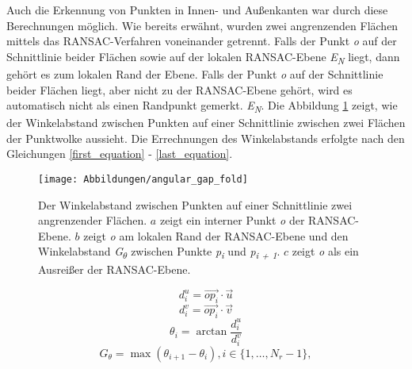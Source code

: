 Auch die Erkennung von Punkten in Innen- und Außenkanten war durch diese Berechnungen möglich. Wie bereits erwähnt, wurden zwei angrenzenden Flächen mittels das RANSAC-Verfahren voneinander getrennt. Falls der Punkt \textit{o} auf der Schnittlinie beider Flächen sowie auf der lokalen RANSAC-Ebene \textit{E\textsubscript{N}} liegt, dann gehört es zum lokalen Rand der Ebene. Falls der Punkt \textit{o} auf der Schnittlinie beider Flächen liegt, aber nicht zu der RANSAC-Ebene gehört, wird es automatisch nicht als einen Randpunkt gemerkt. \textit{E\textsubscript{N}}. Die Abbildung \ref{edge_fold} zeigt, wie der Winkelabstand zwischen Punkten auf einer Schnittlinie zwischen zwei Flächen der Punktwolke aussieht. Die Errechnungen des Winkelabstands erfolgte nach den Gleichungen \ref{first_equation} - \ref{last_equation}.

\begin{figure}[h]
	\texttt{[image: Abbildungen/angular\_gap\_fold]}
	\centering
	\caption{Der Winkelabstand zwischen Punkten auf einer Schnittlinie zwei angrenzender Flächen. \textbf{\(a\)} zeigt ein interner Punkt \textit{o} der RANSAC-Ebene. \textbf{\(b\)} zeigt \textit{o} am lokalen Rand der RANSAC-Ebene und den Winkelabstand \textit{G\textsubscript{$\theta$}} zwischen Punkte \textit{p\textsubscript{i}} und \textit{p\textsubscript{i + 1}}. \textbf{\(c\)} zeigt \textit{o} als ein Ausreißer der RANSAC-Ebene. \autocite{ni_edge_2016}}
	\label{edge_fold}
\end{figure}

\begin{equation}
\label{first_equation}
d_i^u = \vec{{op}_i} \cdot \vec{u}
\end{equation}
\begin{equation}
d_i^v = \vec{{op}_i} \cdot \vec{v}
\end{equation}
\begin{equation}
\theta_i = \arctan{\frac{d_i^u}{d_i^v}}
\end{equation}
\begin{equation}
G_\theta = \max(\theta_{i + 1} - \theta_i), i \in \{1, \ldots, N_r - 1\},
\label{last_equation}
\end{equation}


